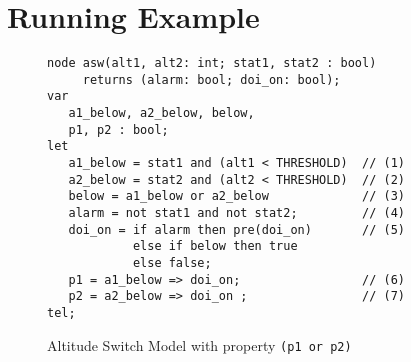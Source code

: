 \section{Running Example}
\label{sec:example}


\begin{figure}[t]
\centering
{\smaller
\begin{verbatim}
node asw(alt1, alt2: int; stat1, stat2 : bool)
     returns (alarm: bool; doi_on: bool);
var
   a1_below, a2_below, below,
   p1, p2 : bool;
let
   a1_below = stat1 and (alt1 < THRESHOLD)  // (1) 
   a2_below = stat2 and (alt2 < THRESHOLD)  // (2) 
   below = a1_below or a2_below             // (3)
   alarm = not stat1 and not stat2;         // (4)
   doi_on = if alarm then pre(doi_on)       // (5)
            else if below then true
            else false;
   p1 = a1_below => doi_on;                 // (6)
   p2 = a2_below => doi_on ;                // (7)
tel;
\end{verbatim}
}
\vspace{-0.1in}
\caption{Altitude Switch Model with property \small{\texttt{(p1 or p2)}}}
\label{fig:asw}
\end{figure}

